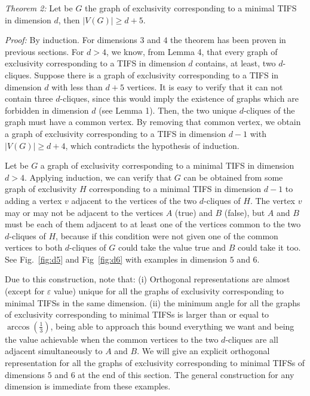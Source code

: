 \documentclass[%
 twocolumn,
 groupedaddress,
 showpacs,
 showkeys,
 preprintnumbers,
 amsmath,amssymb,
 aps,
 pra,
 longbibliography,
 floatfix,
 ]{revtex4-1}
\def\endproof{\vrule height6pt width6pt depth0pt}
\begin{document}
{\em Theorem 2:} Let be $G$ the graph of exclusivity corresponding to a minimal TIFS in dimension $d$, then $|V(G)| \geq d+5$.


{\em Proof:} By induction. For dimensions $ 3 $ and $ 4 $ the theorem has been proven in previous sections. For $ d> 4 $, we know, from Lemma 4, that every graph of exclusivity corresponding to a TIFS in dimension $ d $ contains, at least, two $d$-cliques.
Suppose there is a graph of exclusivity corresponding to a TIFS in dimension $ d $ with less than $ d + 5 $ vertices. It is easy to verify that it can not contain
three $d$-cliques, since this would imply the existence of graphs which are forbidden in dimension $ d $ (see Lemma 1). Then, the two unique $d$-cliques of the graph must have a common vertex. By removing that common vertex, we obtain a graph of exclusivity corresponding to a TIFS in dimension $ d-1 $ with $ | V (G) | \geq d + 4 $, which contradicts the hypothesis of induction. \hfill \endproof


Let be $ G $ a graph of exclusivity corresponding to a minimal TIFS in dimension $ d> 4 $.
Applying induction, we can verify that $ G $ can be obtained from some graph of exclusivity $ H $ corresponding to a minimal TIFS in dimension $ d-1 $ to adding a vertex $ v $ adjacent to the vertices of the two $d$-cliques of $ H $. The vertex $ v $ may or may not be adjacent to the vertices $ A $ (true) and $ B $ (false), but $ A $ and $ B $ must be each of them adjacent to at least one of the vertices common to the two $d$-cliques of $ H $, because if this condition were not given one of the common vertices to both $d$-cliques of $ G $ could take the value true and $ B $ could take it too. See Fig.~\ref{fig:d5} and Fig~\ref{fig:d6} with examples in dimension $ 5 $ and $ 6 $.

Due to this construction, note that: (i) Orthogonal representations are almost (except for $ \varepsilon $ value) unique for all the graphs of exclusivity corresponding to minimal TIFSs in the same dimension. (ii) the minimum angle for all the graphs of exclusivity corresponding to minimal TIFSs is larger than or equal to $ \arccos \left(\frac{1}{3}\right)$, being able to approach this bound everything we want and being the value achievable when the common vertices to the two $d$-cliques are all adjacent simultaneously to $ A $ and $ B $. We will give an explicit orthogonal representation for all the graphs of exclusivity corresponding to minimal TIFSs of dimensions $ 5 $ and $ 6 $ at the end of this section. The general construction for any dimension is immediate from these examples.
\end{document}
